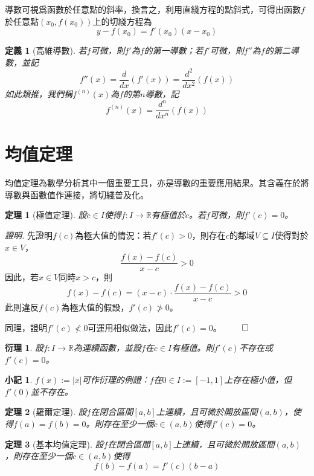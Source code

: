\documentclass[12pt]{article}
\newtheorem{definition}{定義}
\newtheorem*{theorem}{定理}
\newtheorem*{corollary}{衍理}
\newtheorem*{remark}{小記}
\renewenvironment*{proof}{\textit{證明.}}{\hfill$\qed$}
\begin{document}
    導數可視爲函數於任意點的斜率，換言之，利用直綫方程的點斜式，可得出函數$f$於任意點$(x_0,f(x_0))$上的切綫方程為$$y-f(x_0)=f'(x_0)(x-x_0)$$

    \begin{definition}[高維導數]
        若$f$可微，則$f'$為$f$的第一導數；若$f'$可微，則$f''$為$f$的第二導數，並記$$f''(x)=\dfrac{d}{dx}(f'(x))=\dfrac{d^2}{dx^2}(f(x))$$如此類推，我們稱$f^{(n)}(x)$為$f$的第$n$導數，記$$f^{(n)}(x)=\dfrac{d^n}{dx^n}(f(x))$$
    \end{definition}

    \section*{均值定理}

    均值定理為數學分析其中一個重要工具，亦是導數的重要應用結果。其含義在於將導數與函數值作連接，將切綫普及化。

    \begin{theorem}[極值定理]
        設$c\in I$使得$f:I\to \mathbb{R}$有極值於$c$。若$f$可微，則$f'(c)=0$。
    \end{theorem}

    \begin{proof}
        先證明$f(c)$為極大值的情況：若$f'(c)>0$，則存在$c$的鄰域$V\subseteq I$使得對於$x\in V$，$$\frac{f(x)-f(c)}{x-c}>0$$因此，若$x\in V$同時$x>c$，則$$f(x)-f(c)=(x-c)\cdot\frac{f(x)-f(c)}{x-c}>0$$此則違反$f(c)$為極大值的假設，$f'(c)\not > 0$。

        同理，證明$f'(c)\not < 0$可運用相似做法，因此$f'(c)=0$。
    \end{proof}

    \begin{corollary}
        設$f:I\to\mathbb{R}$為連續函數，並設$f$在$c\in I$有極值。則$f'(c)$不存在或$f'(c)=0$。
    \end{corollary}

    \begin{remark}
        $f(x):=|x|$可作衍理的例證：$f$在$0\in I:=[-1,1]$上存在極小值，但$f'(0)$並不存在。
    \end{remark}

    \begin{theorem}[羅爾定理]
        設$f$在閉合區間$[a,b]$上連續，且可微於開放區間$(a,b)$，使得$f(a)=f(b)=0$。則存在至少一個$c\in(a,b)$使得$f'(c)=0$。
    \end{theorem}

    \begin{theorem}[基本均值定理]
        設$f$在閉合區間$[a,b]$上連續，且可微於開放區間$(a,b)$，則存在至少一個$c\in(a,b)$使得$$f(b)-f(a)=f'(c)(b-a)$$
    \end{theorem}
\end{document}
